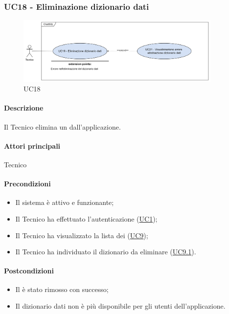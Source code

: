 \subsubsection{UC18 - Eliminazione dizionario dati}\label{UC18}

\begin{figure}[H]
  \centering
  \includegraphics[width=0.90\textwidth]{assets/uc18.png}
  \caption{UC18}
\end{figure}

\paragraph*{Descrizione}
Il Tecnico elimina un  dall'applicazione.

\paragraph*{Attori principali}
Tecnico

\paragraph*{Precondizioni}
\begin{itemize}
  \item Il sistema è attivo e funzionante;
  \item Il Tecnico ha effettuato l'autenticazione (\hyperref[UC1]{UC1});
  \item Il Tecnico ha visualizzato la lista dei  (\hyperref[UC9]{UC9});
  \item Il Tecnico ha individuato il dizionario da eliminare (\hyperref[UC9.1]{UC9.1}).
\end{itemize}

\paragraph*{Postcondizioni}
\begin{itemize}
  \item Il  è stato rimosso con successo;
  \item Il dizionario dati non è più disponibile per gli utenti dell'applicazione.
\end{itemize}

